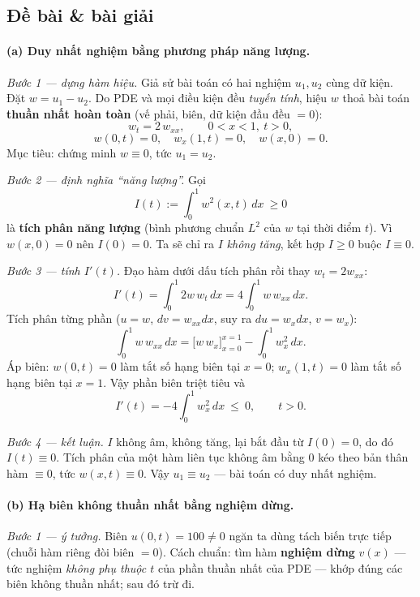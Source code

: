 \subsection*{Đề bài \& bài giải}

\paragraph{(a) Duy nhất nghiệm bằng phương pháp năng lượng.}\leavevmode

\emph{Bước 1 --- dựng hàm hiệu.} Giả sử bài toán có hai nghiệm $u_1, u_2$ cùng dữ kiện. Đặt $w=u_1-u_2$. Do PDE và mọi điều kiện đều \emph{tuyến tính}, hiệu $w$ thoả bài toán \textbf{thuần nhất hoàn toàn} (vế phải, biên, dữ kiện đầu đều $=0$):
\[
w_t = 2\,w_{xx},\qquad 0<x<1,\ t>0,
\]
\[
w(0,t)=0,\quad w_x(1,t)=0,\quad w(x,0)=0.
\]
Mục tiêu: chứng minh $w\equiv0$, tức $u_1=u_2$.

\emph{Bước 2 --- định nghĩa ``năng lượng''.} Gọi
\[
I(t):=\int_0^1 w^2(x,t)\,dx\ \ge 0
\]
là \textbf{tích phân năng lượng} (bình phương chuẩn $L^2$ của $w$ tại thời điểm $t$). Vì $w(x,0)=0$ nên $I(0)=0$. Ta sẽ chỉ ra $I$ \emph{không tăng}, kết hợp $I\ge0$ buộc $I\equiv0$.

\emph{Bước 3 --- tính $I'(t)$.} Đạo hàm dưới dấu tích phân rồi thay $w_t=2w_{xx}$:
\[
I'(t)=\int_0^1 2w\,w_t\,dx=4\int_0^1 w\,w_{xx}\,dx.
\]
Tích phân từng phần ($u=w$, $dv=w_{xx}dx$, suy ra $du=w_x dx$, $v=w_x$):
\[
\int_0^1 w\,w_{xx}\,dx = \big[w\,w_x\big]_{x=0}^{x=1} - \int_0^1 w_x^2\,dx.
\]
Áp biên: $w(0,t)=0$ làm tắt số hạng biên tại $x=0$; $w_x(1,t)=0$ làm tắt số hạng biên tại $x=1$. Vậy phần biên triệt tiêu và
\[
I'(t)=-4\int_0^1 w_x^2\,dx\ \le\ 0,\qquad t>0.
\]

\emph{Bước 4 --- kết luận.} $I$ không âm, không tăng, lại bắt đầu từ $I(0)=0$, do đó $I(t)\equiv0$. Tích phân của một hàm liên tục không âm bằng $0$ kéo theo bản thân hàm $\equiv0$, tức $w(x,t)\equiv0$. Vậy $u_1\equiv u_2$ --- bài toán có duy nhất nghiệm.

\paragraph{(b) Hạ biên không thuần nhất bằng nghiệm dừng.}\leavevmode

\emph{Bước 1 --- ý tưởng.} Biên $u(0,t)=100\ne0$ ngăn ta dùng tách biến trực tiếp (chuỗi hàm riêng đòi biên $=0$). Cách chuẩn: tìm hàm \textbf{nghiệm dừng} $v(x)$ --- tức nghiệm \emph{không phụ thuộc $t$} của phần thuần nhất của PDE --- khớp đúng các biên không thuần nhất; sau đó trừ đi.

